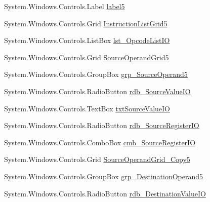 \begin{DoxyCompactItemize}
\item 
System.\+Windows.\+Controls.\+Label \hyperlink{class_c_p_u___o_s___simulator_1_1_instructions_window_acfbda3e1b251a166abc72a07d4cb5025}{label5}
\item 
System.\+Windows.\+Controls.\+Grid \hyperlink{class_c_p_u___o_s___simulator_1_1_instructions_window_a335e8ec02a78ffc483900745de96b602}{Instruction\+List\+Grid5}
\item 
System.\+Windows.\+Controls.\+List\+Box \hyperlink{class_c_p_u___o_s___simulator_1_1_instructions_window_aa8ccd453237503f0e15aff22975cea68}{lst\+\_\+\+Opcode\+List\+I\+O}
\item 
System.\+Windows.\+Controls.\+Grid \hyperlink{class_c_p_u___o_s___simulator_1_1_instructions_window_a3066f4664c81bacc6decdf84d08e74a9}{Source\+Operand\+Grid5}
\item 
System.\+Windows.\+Controls.\+Group\+Box \hyperlink{class_c_p_u___o_s___simulator_1_1_instructions_window_ab16ea5f8e2e761d0a7a0fe7054dfa3b5}{grp\+\_\+\+Source\+Operand5}
\item 
System.\+Windows.\+Controls.\+Radio\+Button \hyperlink{class_c_p_u___o_s___simulator_1_1_instructions_window_ad7bb114a6f948e79e55a44943ecf660a}{rdb\+\_\+\+Source\+Value\+I\+O}
\item 
System.\+Windows.\+Controls.\+Text\+Box \hyperlink{class_c_p_u___o_s___simulator_1_1_instructions_window_a14161b7bebd71e7545b59f77f6254a26}{txt\+Source\+Value\+I\+O}
\item 
System.\+Windows.\+Controls.\+Radio\+Button \hyperlink{class_c_p_u___o_s___simulator_1_1_instructions_window_a30064f400e25a6b155a34108a3fba816}{rdb\+\_\+\+Source\+Register\+I\+O}
\item 
System.\+Windows.\+Controls.\+Combo\+Box \hyperlink{class_c_p_u___o_s___simulator_1_1_instructions_window_a9f9d831a77d174675da89b1fe03602ad}{cmb\+\_\+\+Source\+Register\+I\+O}
\item 
System.\+Windows.\+Controls.\+Grid \hyperlink{class_c_p_u___o_s___simulator_1_1_instructions_window_a5a43b8933f014dffe28d3aa610518a94}{Source\+Operand\+Grid\+\_\+\+Copy5}
\item 
System.\+Windows.\+Controls.\+Group\+Box \hyperlink{class_c_p_u___o_s___simulator_1_1_instructions_window_aa99ecad0d35bc5e70a8924c9b3913106}{grp\+\_\+\+Destination\+Operand5}
\item 
System.\+Windows.\+Controls.\+Radio\+Button \hyperlink{class_c_p_u___o_s___simulator_1_1_instructions_window_a012739d419d605946f5dc0fd645db182}{rdb\+\_\+\+Destination\+Value\+I\+O}
\item 

\end{DoxyCompactItemize}
